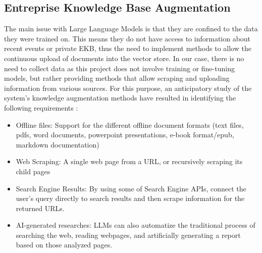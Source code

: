 \subsection{Entreprise Knowledge Base Augmentation}
The main issue with Large Language Models is that they are confined to the data they were trained on. This means they do not have access to information about recent events or private EKB, thus the need to implement methods to allow the continuous upload of documents into the vector store.\newline
In our case, there is no need to collect data as this project does not involve training or fine-tuning models, but rather providing methods that allow scraping and uploading information from various sources.\newline
For this purpose, an anticipatory study of the system's knowledge augmentation methods have resulted in identifying the following requirements :
\begin{itemize}
    \item Offline files: Support for the different offline document formats (text files, pdfs, word documents, powerpoint presentations, e-book format/epub, markdown documentation)
    \item Web Scraping: A single web page from a URL, or recursively scraping its child pages
    \item Search Engine Results: By using some of Search Engine APIs, connect the user's query directly to search results and then scrape information for the returned URLs.
    \item AI-generated researches: LLMs can also automatize the traditional process of searching the web, reading webpages, and artificially generating a report based on those analyzed pages.
\end{itemize}